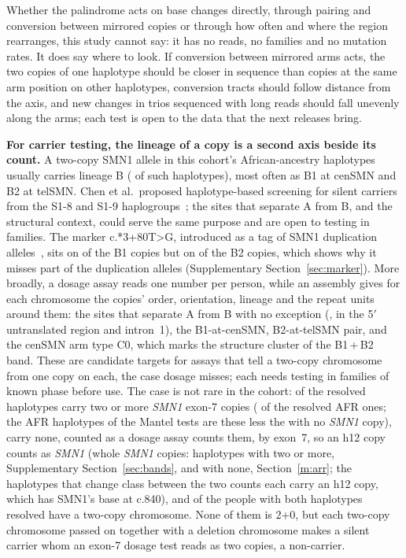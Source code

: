 \documentclass[10pt]{article}
\newcommand{\cpe}{c.*3+80T>G}
\begin{document}
Whether the palindrome acts on
base changes directly, through pairing and conversion between mirrored copies or through how often and where the
region rearranges, this study cannot say: it has no reads, no families and no mutation rates. It does say where to
look. If conversion between mirrored arms acts, the two copies of one haplotype should be closer in sequence than
copies at the same arm position on other haplotypes, conversion tracts should follow distance from the axis, and new
changes in trios sequenced with long reads should fall unevenly along the arms; each test is open to the data that
the next releases bring.

\textbf{For carrier testing, the lineage of a copy is a second axis beside its count.} A two-copy SMN1 allele in this
cohort's African-ancestry haplotypes usually carries lineage B (\ldTestBMulti{} of \ldTestMultiN{} such haplotypes),
most often as B1 at cenSMN and B2 at telSMN. Chen et al.\ proposed haplotype-based screening for silent carriers from
the S1-8 and S1-9 haplogroups~\cite{chen2023}; the sites that separate A from B, and the structural context, could serve
the same purpose and are open to testing in families. The marker \cpe{}, introduced as a tag of SMN1 duplication alleles~\cite{luo2014}, sits on \linBoneMk{} of the \linBone{} B1 copies but on \linBtwoMk{} of the \linBtwo{} B2 copies, which shows
why it misses part of the duplication alleles (Supplementary Section~\ref{sec:marker}). More broadly, a dosage assay reads one
number per person, while an assembly gives for each chromosome the copies' order, orientation, lineage and the repeat
units around them: the sites that separate A from B with no exception (\abPerfect, in the 5$'$ untranslated region and intron~1), the
B1-at-cenSMN, B2-at-telSMN pair, and the cenSMN arm type C0, which marks the structure cluster of the B1\,+\,B2 band. These are
candidate targets for assays that tell a two-copy chromosome from one copy on each, the case dosage misses; each
needs testing in families of known phase before use. The case is not rare in the cohort: \dosTwo{} of the \nHapsRes{} resolved haplotypes carry two or more \emph{SMN1} exon-7 copies (\dosTwoAfr{} of the \dosAfrHaps{} resolved AFR ones; the \mOneAFRN{} AFR haplotypes of the Mantel tests are these less the \dosAfrNoSmnOne{} with no \emph{SMN1} copy), \dosZero{} carry none, counted as a dosage assay counts them, by exon~7, so an h12 copy counts as \emph{SMN1} (whole \emph{SMN1} copies: \dosTwoCopy{} haplotypes with two or more, Supplementary Section~\ref{sec:bands}, and \dosNoCopy{} with none, Section~\ref{m:arr}; the \dosHOneTwoN{} haplotypes that change class between the two counts each carry an h12 copy, which has SMN1's base at c.840), and \dosPeopleTwo{} of the \dosPeople{} people with both haplotypes resolved have a two-copy chromosome. None of them is 2+0, but each two-copy chromosome passed on together with a deletion chromosome makes a silent carrier whom an exon-7 dosage test reads as two copies, a non-carrier.
\end{document}

